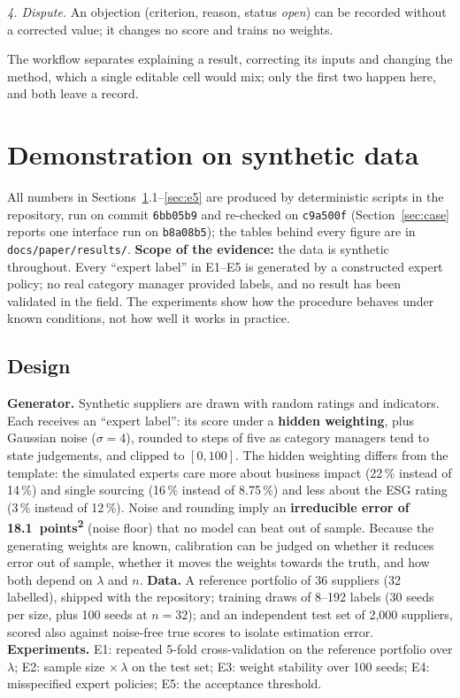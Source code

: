 \documentclass[10pt,twocolumn,a4paper]{article}
\newcommand{\code}[1]{{\small\texttt{#1}}}
\newcommand{\ptsq}{points\textsuperscript{2}}
\begin{document}
\emph{4. Dispute.} An objection (criterion, reason, status \emph{open}) can be recorded
without a corrected value; it changes no score and trains no weights.

The workflow separates explaining a result, correcting its inputs and changing the method,
which a single editable cell would mix; only the first two happen here, and both leave a record.

\section{Demonstration on synthetic data}
\label{sec:demo}

All numbers in Sections~\ref{sec:demo}.1--\ref{sec:e5} are produced by deterministic scripts
in the repository, run on commit \code{6bb05b9} and re-checked on \code{c9a500f}
(Section~\ref{sec:case} reports one interface run on \code{b8a08b5}); the tables behind every
figure are in \code{docs/paper/results/}. \textbf{Scope of the evidence:} the data is
synthetic throughout. Every ``expert label'' in E1--E5 is generated by a constructed expert
policy; no real category manager provided labels, and no result has been validated in the
field. The experiments show how the procedure behaves under known conditions, not how well
it works in practice.

\subsection{Design}
\textbf{Generator.} Synthetic suppliers are drawn with random ratings and indicators.
Each receives an ``expert label'': its score under a \textbf{hidden weighting}, plus
Gaussian noise ($\sigma=4$), rounded to steps of five as category managers tend to state
judgements, and clipped to $[0,100]$. The hidden weighting differs from the template:
the simulated experts care more about business impact (22\,\% instead of 14\,\%) and
single sourcing (16\,\% instead of 8.75\,\%) and less about the ESG rating (3\,\% instead
of 12\,\%). Noise and rounding imply an \textbf{irreducible error of 18.1~\ptsq} (noise
floor) that no model can beat out of sample. Because the generating weights are known,
calibration can be judged on whether it reduces error out of sample, whether it moves the
weights towards the truth, and how both depend on $\lambda$ and $n$.
\textbf{Data.} A reference portfolio of 36 suppliers (32 labelled), shipped with the
repository; training draws of 8--192 labels (30 seeds per size, plus 100 seeds at
$n=32$); and an independent test set of 2{,}000 suppliers, scored also against
noise-free true scores to isolate estimation error.
\textbf{Experiments.} E1: repeated 5-fold cross-validation \cite{stone1974,kohavi1995} on
the reference portfolio over $\lambda$; E2: sample size $\times\,\lambda$ on the test set; E3: weight stability
over 100 seeds; E4: misspecified expert policies; E5: the acceptance threshold.
\end{document}
